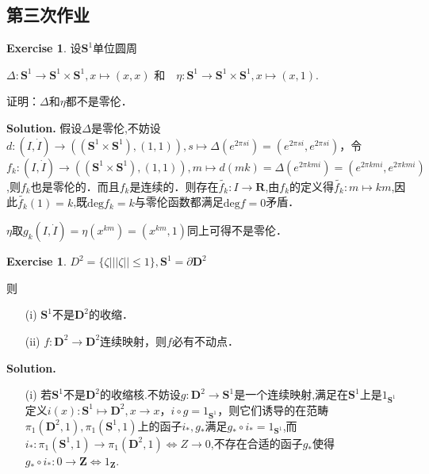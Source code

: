 \documentclass[a4paper]{book}
\newenvironment{solution}%
{\noindent\textbf{Solution.}}%
{\qedhere}
\numberwithin{equation}{chapter}
\theoremstyle{definition}
\newtheorem{exc}[exm]{Exercise}
\begin{document}
\begin{multicols}{2}
\setlength{\columnseprule}{0.2pt}  

\section{第三次作业}

\begin{exc}
	设$ \mathbf{S}^1 $单位圆周
	
	$\Delta: \mathbf{S}^1 \rightarrow  \mathbf{S}^1 \times  \mathbf{S}^1, x \mapsto (x,x) \text{ 和　} \eta:  \mathbf{S}^1 \rightarrow  \mathbf{S}^1 \times  \mathbf{S}^1, x \mapsto (x,1) $.
	
	证明：$ \Delta $和$ \eta $都不是零伦．
\end{exc}

\begin{solution}
	假设$ \Delta $是零伦,不妨设$d:(I,\dot{I}) \rightarrow  ((\mathbf{S}^1 \times  \mathbf{S}^1),(1,1)), s \mapsto \Delta(e^{2\pi si}) = (e^{2\pi si}, e^{2\pi si}) $，令$ f_k:(I,\dot{I}) \rightarrow ((\mathbf{S}^1 \times  \mathbf{S}^1),(1,1)) , m \mapsto d(mk) = \Delta(e^{2\pi kmi}) = (e^{2\pi kmi}, e^{2\pi kmi}) $,则$ f_k $也是零伦的．而且$ f_k $是连续的．则存在$ \widetilde{f_k}: I \rightarrow \mathbf{R} $,由$ f_k $的定义得$ \widetilde{f_k}: m \mapsto km$,因此$ \widetilde{f_k}(1) = k $,既$ \text{deg}f_k = k $与零伦函数都满足$ \text{deg}f =0 $矛盾．
	
	$ \eta $取$ g_k(I,\dot{I}) = \eta(x^{km}) = (x^{km},　1) $同上可得不是零伦．
\end{solution}

\begin{exc}
	$ D^2 = \{ \zeta \big| ||\zeta|| \leq 1 \}, \mathbf{S}^1 = \partial \mathbf{D}^2 $
	
	则\begin{itemize}
		\item [(i)] $ \mathbf{S}^1 $不是$ \mathbf{D}^2 $的收缩．
		\item [(ii)] $ f: \mathbf{D}^2 \rightarrow \mathbf{D}^2 $连续映射，则$ f $必有不动点．
	\end{itemize}
\end{exc}

\begin{solution}
	\begin{itemize}
		\item [(i)] 若$ \mathbf{S}^1 $不是$ \mathbf{D}^2 $的收缩核.不妨设$g: \mathbf{D}^2 \rightarrow \mathbf{S}^1 $是一个连续映射,满足在$\mathbf{S}^1$上是$1_{\mathbf{S}^1}$定义$ i(x): \mathbf{S}^1 \mapsto \mathbf{D}^2, x \rightarrow x $，$ i \circ g = 1_{\mathbf{S}^1} $，则它们诱导的在范畴$ \pi_1(\mathbf{D}^2, 1), \pi_1(\mathbf{S}^1, 1) $上的函子$ i_*, g_* $满足$ g_* \circ i_* = 1_{\mathbf{S}^1} $,而$ i_*:  \pi_1(\mathbf{S}^1, 1) \rightarrow \pi_1(\mathbf{D}^2, 1) \Longleftrightarrow Z \rightarrow {0} $,不存在合适的函子$ g_* $使得$ g_* \circ i_*: {0} \rightarrow \mathbf{Z} \Longleftrightarrow 1_{\mathbf{Z}} $.
		

\end{itemize}
\end{solution}
\end{multicols}
\end{document}
